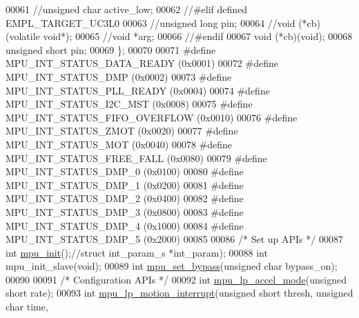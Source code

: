 \begin{DoxyCode}
00061     \textcolor{comment}{//unsigned char active\_low;}
00062 \textcolor{comment}{//#elif defined EMPL\_TARGET\_UC3L0}
00063     \textcolor{comment}{//unsigned long pin;}
00064     \textcolor{comment}{//void (*cb)(volatile void*);}
00065     \textcolor{comment}{//void *arg;    }
00066 \textcolor{comment}{//#endif}
00067     void (*cb)(void);
00068     \textcolor{keywordtype}{unsigned} \textcolor{keywordtype}{short} pin;
00069 \};
00070 
00071 \textcolor{preprocessor}{#define MPU\_INT\_STATUS\_DATA\_READY       (0x0001)}
00072 \textcolor{preprocessor}{#define MPU\_INT\_STATUS\_DMP              (0x0002)}
00073 \textcolor{preprocessor}{#define MPU\_INT\_STATUS\_PLL\_READY        (0x0004)}
00074 \textcolor{preprocessor}{#define MPU\_INT\_STATUS\_I2C\_MST          (0x0008)}
00075 \textcolor{preprocessor}{#define MPU\_INT\_STATUS\_FIFO\_OVERFLOW    (0x0010)}
00076 \textcolor{preprocessor}{#define MPU\_INT\_STATUS\_ZMOT             (0x0020)}
00077 \textcolor{preprocessor}{#define MPU\_INT\_STATUS\_MOT              (0x0040)}
00078 \textcolor{preprocessor}{#define MPU\_INT\_STATUS\_FREE\_FALL        (0x0080)}
00079 \textcolor{preprocessor}{#define MPU\_INT\_STATUS\_DMP\_0            (0x0100)}
00080 \textcolor{preprocessor}{#define MPU\_INT\_STATUS\_DMP\_1            (0x0200)}
00081 \textcolor{preprocessor}{#define MPU\_INT\_STATUS\_DMP\_2            (0x0400)}
00082 \textcolor{preprocessor}{#define MPU\_INT\_STATUS\_DMP\_3            (0x0800)}
00083 \textcolor{preprocessor}{#define MPU\_INT\_STATUS\_DMP\_4            (0x1000)}
00084 \textcolor{preprocessor}{#define MPU\_INT\_STATUS\_DMP\_5            (0x2000)}
00085 
00086 \textcolor{comment}{/* Set up APIs */}
00087 \textcolor{keywordtype}{int} \hyperlink{group___d_r_i_v_e_r_s_ga63637cf3771995aeda99d91d5f345f29}{mpu\_init}();\textcolor{comment}{//struct int\_param\_s *int\_param);}
00088 \textcolor{keywordtype}{int} mpu\_init\_slave(\textcolor{keywordtype}{void});
00089 \textcolor{keywordtype}{int} \hyperlink{group___d_r_i_v_e_r_s_ga36f70f38371b48d81094d3b061233e15}{mpu\_set\_bypass}(\textcolor{keywordtype}{unsigned} \textcolor{keywordtype}{char} bypass\_on);
00090 
00091 \textcolor{comment}{/* Configuration APIs */}
00092 \textcolor{keywordtype}{int} \hyperlink{group___d_r_i_v_e_r_s_gabdcf10922a1a20f1b5bbd7576d3189b9}{mpu\_lp\_accel\_mode}(\textcolor{keywordtype}{unsigned} \textcolor{keywordtype}{short} rate);
00093 \textcolor{keywordtype}{int} \hyperlink{group___d_r_i_v_e_r_s_ga7d0b3259346898ccd1ba6ef78bf7df97}{mpu\_lp\_motion\_interrupt}(\textcolor{keywordtype}{unsigned} \textcolor{keywordtype}{short} thresh, \textcolor{keywordtype}{unsigned} \textcolor{keywordtype}{char} time,

\end{DoxyCode}
